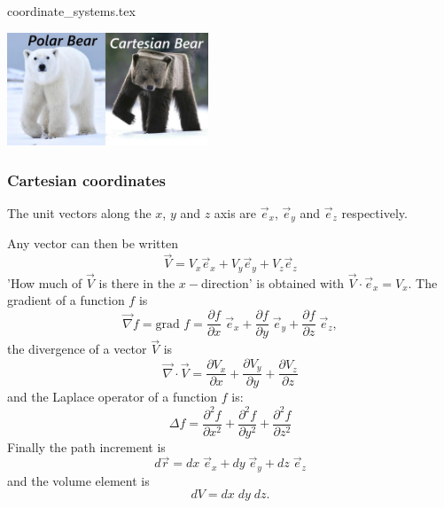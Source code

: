 \begin{flushright} {\tiny {\color{gray} coordinate\_systems.tex}} \end{flushright}

\begin{center}
\includegraphics[width=6cm]{images/polarbear}
\end{center}

\subsubsection{Cartesian coordinates}

The unit vectors along the $x$, $y$ and $z$ axis are 
$\vec{e}_x$, $\vec{e}_y$ and $\vec{e}_z$ respectively.



\noindent Any vector can then be written
\[
{\vec V}  = V_x {\vec e}_x  + V_y {\vec e}_y + V_z \vec{e}_z
\]
'How much of $\vec{V}$ is there in the $x-$direction' is obtained
with $\vec{V}\cdot\vec{e}_x = V_x$.
The gradient of a function $f$ is 
\[
\vec{\nabla} f= \text{grad }f= 
\frac{\partial f}{\partial x}\; \vec{e}_x +
\frac{\partial f}{\partial y}\; \vec{e}_y +
\frac{\partial f}{\partial z}\; \vec{e}_z,
\]
the divergence of a vector $\vec{V}$ is
\[
\vec{\nabla}\cdot \vec{V} = 
\frac{\partial V_x}{\partial x}+
\frac{\partial V_y}{\partial y}+
\frac{\partial V_z}{\partial z}
\]
and the Laplace operator of a function $f$ is:
\[
\Delta f = 
\frac{\partial^2 f}{\partial x^2} + 
\frac{\partial^2 f}{\partial y^2} + 
\frac{\partial^2 f}{\partial z^2}  
\]
Finally the path increment is
\[
d\vec{r} = dx \; {\vec e}_x  + dy\; {\vec e}_y + dz \; \vec{e}_z
\]
and the volume element is 
\[
dV=dx\; dy \; dz.
\]

